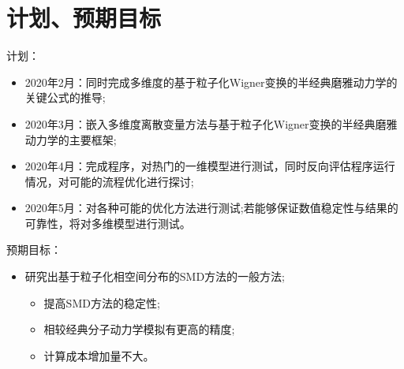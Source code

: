 \documentclass{beamer}
\begin{document}
\section{计划、预期目标}
计划：
\begin{itemize}
	\item 2020年2月：同时完成多维度的基于粒子化Wigner变换的半经典磨雅动力学的关键公式的推导;
	\item 2020年3月：嵌入多维度离散变量方法与基于粒子化Wigner变换的半经典磨雅动力学的主要框架;
	\item 2020年4月：完成程序，对热门的一维模型进行测试，同时反向评估程序运行情况，对可能的流程优化进行探讨;
	\item 2020年5月：对各种可能的优化方法进行测试;若能够保证数值稳定性与结果的可靠性，将对多维模型进行测试。
\end{itemize}
预期目标：
\begin{itemize}
\item 研究出基于粒子化相空间分布的SMD方法的一般方法;
\begin{itemize}
\item 提高SMD方法的稳定性;
\item 相较经典分子动力学模拟有更高的精度;
\item 计算成本增加量不大。 
\end{itemize}
\end{itemize}
\end{document}
